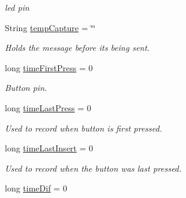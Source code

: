 \begin{DoxyCompactItemize}
\begin{DoxyCompactList}\small\item\em led pin \end{DoxyCompactList}\item 
\mbox{\label{_arduino_morse_client_8ino_a6ca5036f31eb60b8260d078976e59149}} 
String \mbox{\hyperlink{_arduino_morse_client_8ino_a6ca5036f31eb60b8260d078976e59149}{temp\+Capture}} = \char`\"{}\char`\"{}
\begin{DoxyCompactList}\small\item\em Holds the message before it\textquotesingle{}s being sent. \end{DoxyCompactList}\item 
\mbox{\label{_arduino_morse_client_8ino_a4519918721f91dae25e6eb085f60efd0}} 
long \mbox{\hyperlink{_arduino_morse_client_8ino_a4519918721f91dae25e6eb085f60efd0}{time\+First\+Press}} = 0
\begin{DoxyCompactList}\small\item\em Button pin. \end{DoxyCompactList}\item 
\mbox{\label{_arduino_morse_client_8ino_a0bc9b0b1e5cf6d2a43ae395d5b92adfa}} 
long \mbox{\hyperlink{_arduino_morse_client_8ino_a0bc9b0b1e5cf6d2a43ae395d5b92adfa}{time\+Last\+Press}} = 0
\begin{DoxyCompactList}\small\item\em Used to record when button is first pressed. \end{DoxyCompactList}\item 
\mbox{\label{_arduino_morse_client_8ino_a8ab75efd2de57cd9e2931f5b101e55a5}} 
long \mbox{\hyperlink{_arduino_morse_client_8ino_a8ab75efd2de57cd9e2931f5b101e55a5}{time\+Last\+Insert}} = 0
\begin{DoxyCompactList}\small\item\em Used to record when the button was last pressed. \end{DoxyCompactList}\item 
\mbox{\label{_arduino_morse_client_8ino_a3c1aad3dc8933e1a80684c4524899cc0}} 
long \mbox{\hyperlink{_arduino_morse_client_8ino_a3c1aad3dc8933e1a80684c4524899cc0}{time\+Dif}} = 0

\end{DoxyCompactItemize}
